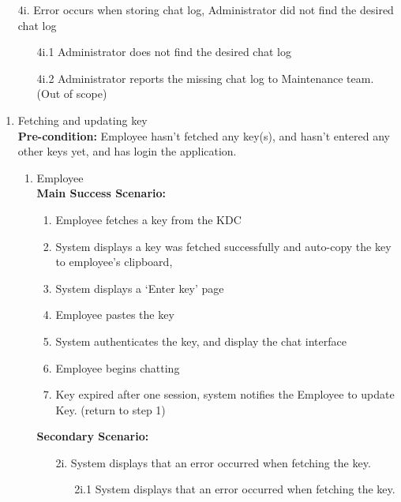 \documentclass[]{article}
\begin{document}
\begin{enumerate}[{\bf BE1.}]
\begin{enumerate}[{\bf BE8.}]
\begin{enumerate}
                    \item[4i.] Error occurs when storing chat log, Administrator did not find the desired chat log 
                    \begin{enumerate}
                        \item[4i.1] Administrator does not find the desired chat log 
                        \item[4i.2] Administrator reports the missing chat log to Maintenance team. (Out of scope)
                    \end{enumerate}
                \end{enumerate}
\end{enumerate}

\begin{enumerate}[{\bf BE9.}]
	\item Fetching and updating key \\
        \textbf{Pre-condition:} Employee hasn’t fetched any key(s), and hasn’t entered any other keys yet, and has login the application.   
		\begin{enumerate}[{\bf VP1.}]
			\item Employee \\
   				\textbf{Main Success Scenario:}
                \begin{enumerate}[{  1.}]
                    \item Employee fetches a key from the KDC 
		    \item System displays a key was fetched successfully and auto-copy the key to employee’s clipboard,  
		    \item System displays a ‘Enter key’ page  
		    \item Employee pastes the key 
                    \item System authenticates the key, and display the chat interface 
		    \item Employee begins chatting 
                    \item Key expired after one session, system notifies the Employee to update Key. (return to step 1)  
                \end{enumerate}
                \textbf{Secondary Scenario:}
                \begin{enumerate}
		    \item[2i.] System displays that an error occurred when fetching the key.
                    \begin{enumerate}
                        \item[2i.1] System displays that an error occurred when fetching the key.

\end{enumerate}
\end{enumerate}
\end{enumerate}
\end{enumerate}
\end{enumerate}
\end{document}
